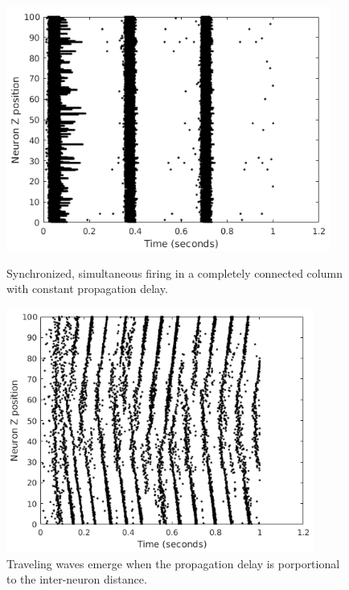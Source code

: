 \documentclass[a4paper,11pt]{article}
\begin{document}
\begin{figure}[!htb]
  \centering
  \begin{minipage}{0.45\textwidth}
      \centering
      \includegraphics[width=0.95\textwidth]{fig/IzzySync}
      \caption{Synchronized, simultaneous firing in a completely connected column with constant propagation delay.}
      \label{fig:sync_fire}
  \end{minipage}\hfill
  \begin{minipage}{0.45\textwidth}
      \centering
      \includegraphics[width=0.9\textwidth]{fig/IzzySync_Delay}
      \caption{Traveling waves emerge when the propagation delay is porportional to the inter-neuron distance. }
      \label{fig:sync_fire_delay}
  \end{minipage}
\end{figure}
\end{document}
